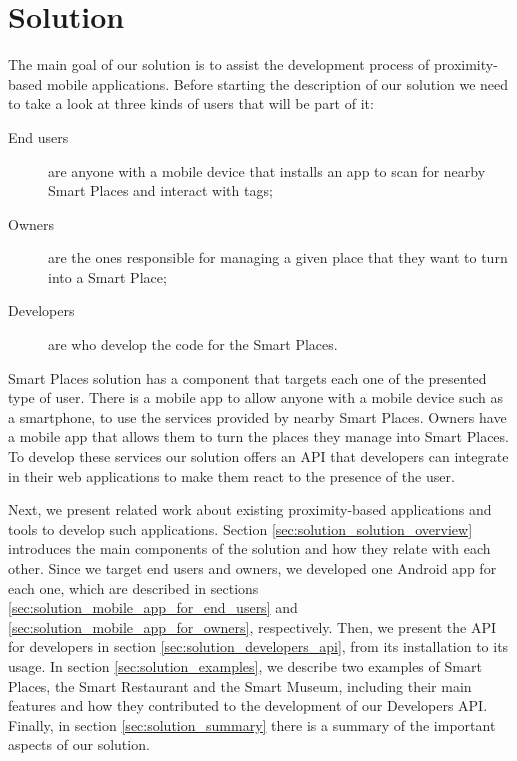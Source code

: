 
\chapter{Solution}
\label{chapter:solution}
The main goal of our solution is to assist
the development process of proximity-based mobile applications.
Before starting the description of our solution we need to take a look at three kinds of users that will be part of it:
\begin{description}
  \item[End users] are anyone with a mobile device that installs an app to scan for nearby Smart Places and interact with tags;
  \item[Owners] are the ones responsible for managing a given place that they want to turn into a Smart Place;
  \item[Developers] are who develop the code for the Smart Places.
\end{description}

Smart Places solution has a component that targets each one of the presented type of user.
There is a mobile app to allow anyone with a mobile device such as a smartphone, to use the services provided by nearby Smart Places.
Owners have a mobile app that allows them to turn the places they manage into Smart Places.
To develop these services our solution offers an \gls{API} that developers can integrate in their web applications to make them react to the presence of the user.

Next, we present related work about existing proximity-based applications and tools to develop such applications.
Section \ref{sec:solution_solution_overview} introduces the main components of the solution and how they relate with each other.
Since we target end users and owners, we developed one Android app for each one, which are described in sections \ref{sec:solution_mobile_app_for_end_users} and \ref{sec:solution_mobile_app_for_owners}, respectively.
Then, we present the \gls{API} for developers in section \ref{sec:solution_developers_api}, from its installation to its usage.
In section \ref{sec:solution_examples}, we describe two examples of Smart Places, the Smart Restaurant and the Smart Museum, including their main features and how they contributed to the development of our Developers \gls{API}.
Finally, in section \ref{sec:solution_summary} there is a summary of the important aspects of our solution.

